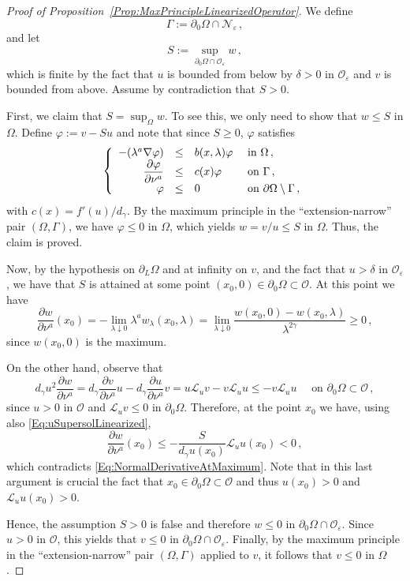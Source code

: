 \documentclass[12pt,reqno]{amsart}
\theoremstyle{definition}
\theoremstyle{remark}
\newcommand{\ncal}{\mathcal{N}}
\newcommand{\ocal}{\mathcal{O}}
\newcommand{\s}{\gamma}
\newcommand\beqc[1]{\left\{\begin{array}{#1}}
\newcommand\eeqc{\end{array} \right.}
\def\PDEsystem{rcll}
\let\div\relax
\DeclareMathOperator{\div}{div}
\numberwithin{equation}{section}
\begin{document}
\begin{proof}[Proof of Proposition~\ref{Prop:MaxPrincipleLinearizedOperator}]
We define
$$
\Gamma := \partial_0 \Omega \cap \ncal_\varepsilon\,,
$$
and let
$$
S := \sup_{\partial_0 \Omega \cap \ocal_\varepsilon } w\,,
$$
which is finite by the fact that $u$ is bounded from below  by $\delta>0$ in $\ocal_\varepsilon$ and $v$ is bounded from above. Assume by contradiction that $S > 0$.

First, we claim that $S = \sup_\Omega w$. To see this, we only need to show that $w \leq S$ in $\Omega$. Define $\varphi := v -Su$ and note that since $S\geq 0$, $\varphi$ satisfies 
$$
\beqc{\PDEsystem}
-\div(\lambda^a \nabla \varphi) &\leq& b(x,\lambda) \varphi & \text{ in } \Omega \,, \\
\dfrac{\partial \varphi}{\partial \nu^a}  &\leq & c(x) \varphi & \text{ on } \Gamma \,, \\
\varphi & \leq & 0 & \text{ on } \partial \Omega \setminus \Gamma  \,,
\eeqc
$$
with $c(x) = f'(u) / d_\s$. By the maximum principle in the ``extension-narrow'' pair $(\Omega,\Gamma)$, we have $\varphi \leq 0$ in $\Omega$, which yields $w = v/u \leq S$ in $\Omega$. Thus, the claim is proved.

Now, by the hypothesis on $\partial_L \Omega$ and at infinity on $v$, and the fact that $u>\delta$ in $\ocal_{\varepsilon}$, we have that $S$ is attained at some point  $(x_0,0)\in\partial_0\Omega \subset \ocal$. At this point we have
\begin{equation}
\label{Eq:NormalDerivativeAtMaximum}
\dfrac{\partial w}{\partial \nu^a}(x_0) = -\lim_{\lambda \downarrow 0} \lambda^a w_\lambda (x_0,\lambda) = \lim_{\lambda \downarrow 0} \dfrac{w(x_0,0) - w(x_0, \lambda)}{\lambda^{2\s}} \geq 0\,,
\end{equation}
since $w(x_0,0)$ is the maximum.

On the other hand, observe that
$$
d_\s u^2 \dfrac{\partial w}{\partial \nu^a} = d_\s  \dfrac{\partial v}{\partial \nu^a} u  - d_\s  \dfrac{\partial u}{\partial \nu^a} v = u \mathscr{L}_u v  -  v \mathscr{L}_u u \leq -v \mathscr{L}_u u \quad \text{ on } \partial_0 \Omega \subset \ocal\,,
$$
since $u>0$ in $\ocal$ and $\mathscr{L}_u v \leq 0$ in $\partial_0 \Omega $. Therefore, at the point $x_0$ we have, using also \eqref{Eq:uSupersolLinearized}, 
$$
\dfrac{\partial w}{\partial \nu^a}(x_0) \leq -\dfrac{S}{d_\s u(x_0)} \mathscr{L}_u u(x_0) < 0\,,
$$
which contradicts \eqref{Eq:NormalDerivativeAtMaximum}. Note that in this last argument is crucial the fact that $x_0 \in \partial_0 \Omega \subset \ocal$ and thus $u(x_0)>0$ and $\mathscr{L}_u u (x_0) > 0$. 

Hence, the assumption $S>0$ is false and therefore $w \leq 0$ in $\partial_0 \Omega \cap \ocal_\varepsilon $. Since $u > 0$ in $\ocal$, this yields that $v \leq 0$ in $\partial_0 \Omega \cap \ocal_\varepsilon $. Finally, by the maximum principle in the ``extension-narrow'' pair $(\Omega, \Gamma)$ applied to $v$, it follows that $v\leq 0$ in $\Omega$.
\end{proof}
\end{document}

